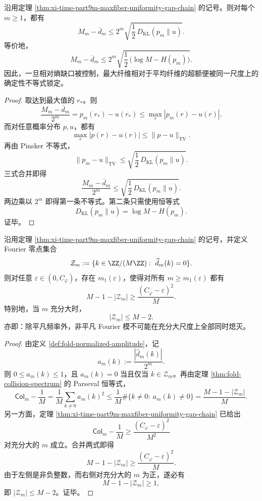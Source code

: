 \begin{theorem}[KL 缺口对最大纤维超额的确定性控制]\label{thm:xi-time-part9m-kl-controls-maxfiber-excess}
沿用定理 \ref{thm:xi-time-part9m-maxfiber-uniformity-gap-chain} 的记号。则对每个 \(m\ge 1\)，都有
\[
\boxed{\;
M_m-\overline d_m
\le
2^m\sqrt{\frac12\,D_{\mathrm{KL}}(p_m\|u)}.\;}
\]
等价地，
\[
\boxed{\;
M_m-\overline d_m
\le
2^m\sqrt{\frac12\,\bigl(\log M-H(p_m)\bigr)}.\;}
\]
因此，一旦相对熵缺口被控制，最大纤维相对于平均纤维的超额便被同一尺度上的确定性不等式锁定。
\end{theorem}
\begin{proof}
取达到最大值的 \(r_\ast\)。则
\[
\frac{M_m-\overline d_m}{2^m}
=
p_m(r_\ast)-u(r_\ast)
\le
\max_r |p_m(r)-u(r)|.
\]
而对任意概率分布 \(p,u\)，都有
\[
\max_r |p(r)-u(r)|
\le
\|p-u\|_{\mathrm{TV}}.
\]
再由 Pinsker 不等式，
\[
\|p_m-u\|_{\mathrm{TV}}
\le
\sqrt{\frac12\,D_{\mathrm{KL}}(p_m\|u)}.
\]
三式合并即得
\[
\frac{M_m-\overline d_m}{2^m}
\le
\sqrt{\frac12\,D_{\mathrm{KL}}(p_m\|u)}.
\]
两边乘以 \(2^m\) 即得第一条不等式。第二条只需使用恒等式
\[
D_{\mathrm{KL}}(p_m\|u)=\log M-H(p_m).
\]
证毕。
\end{proof}

\begin{corollary}\label{cor:xi-time-part9m-fourier-zero-set-nonsaturation}
沿用定理 \ref{thm:xi-time-part9m-maxfiber-uniformity-gap-chain} 的记号，并定义 Fourier 零点集合
\[
\mathcal Z_m:=\{k\in \ZZ/(M\ZZ):\ \widehat d_m(k)=0\}.
\]
则对任意 \(\varepsilon\in(0,C_\varphi)\)，存在 \(m_1(\varepsilon)\)，使得对所有 \(m\ge m_1(\varepsilon)\) 都有
\[
\boxed{\;
M-1-|\mathcal Z_m|
\ge
\frac{(C_\varphi-\varepsilon)^2}{M}.\;}
\]
特别地，当 \(m\) 充分大时，
\[
\boxed{\;
|\mathcal Z_m|\le M-2.\;}
\]
亦即：除平凡频率外，非平凡 Fourier 模不可能在充分大尺度上全部同时熄灭。
\end{corollary}
\begin{proof}
由定义 \ref{def:fold-normalized-amplitude}，记
\[
a_m(k):=\frac{|\widehat d_m(k)|}{2^m}.
\]
则 \(0\le a_m(k)\le 1\)，且 \(a_m(k)=0\) 当且仅当 \(k\in\mathcal Z_m\)。再由定理 \ref{thm:fold-collision-spectrum} 的 Parseval 恒等式，
\[
\mathsf{Col}_m-\frac{1}{M}
=
\frac{1}{M}\sum_{k\ne 0}a_m(k)^2
\le
\frac{1}{M}\#\{k\ne 0:\ a_m(k)\ne 0\}
=
\frac{M-1-|\mathcal Z_m|}{M}.
\]
另一方面，定理 \ref{thm:xi-time-part9m-maxfiber-uniformity-gap-chain} 已给出
\[
\mathsf{Col}_m-\frac{1}{M}
\ge
\frac{(C_\varphi-\varepsilon)^2}{M^2}
\]
对充分大的 \(m\) 成立。合并两式即得
\[
M-1-|\mathcal Z_m|
\ge
\frac{(C_\varphi-\varepsilon)^2}{M}.
\]
由于左侧是非负整数，而右侧对充分大的 \(m\) 为正，遂必有
\[
M-1-|\mathcal Z_m|\ge 1,
\]
即 \(|\mathcal Z_m|\le M-2\)。证毕。
\end{proof}

